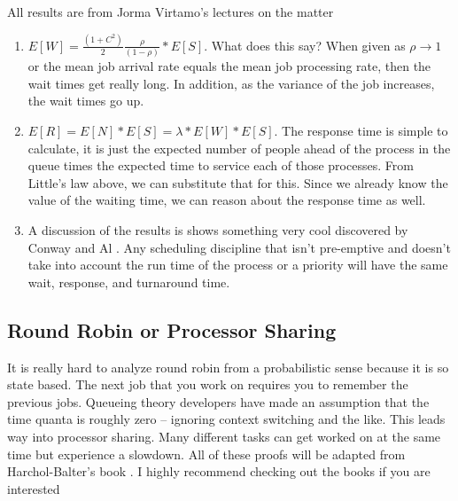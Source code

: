 All results are from Jorma Virtamo's lectures on the matter \cite{virtamo}

\begin{enumerate}
  \item $E[W] = \frac{(1 + C^2)}{2}\frac{\rho}{(1 - \rho)} * E[S]$. What does this say? When given as $\rho \rightarrow 1$ or the mean job arrival rate equals the mean job processing rate, then the wait times get really long. In addition, as the variance of the job increases, the wait times go up.
  \item $E[R] = E[N] * E[S] = \lambda * E[W] * E[S]$. The response time is simple to calculate, it is just the expected number of people ahead of the process in the queue times the expected time to service each of those processes. From Little's law above, we can substitute that for this. Since we already know the value of the waiting time, we can reason about the response time as well.
  \item A discussion of the results is shows something very cool discovered by Conway and Al \cite{conway1967theory}. Any scheduling discipline that isn't pre-emptive and doesn't take into account the run time of the process or a priority will have the same wait, response, and turnaround time.
\end{enumerate}

\subsection{Round Robin or Processor Sharing}

It is really hard to analyze round robin from a probabilistic sense because it is so state based. The next job that you work on requires you to remember the previous jobs. Queueing theory developers have made an assumption that the time quanta is roughly zero -- ignoring context switching and the like.
This leads way into processor sharing. Many different tasks can get worked on at the same time but experience a slowdown.
All of these proofs will be adapted from Harchol-Balter's book \cite{harchol2013performance}.
I highly recommend checking out the books if you are interested

